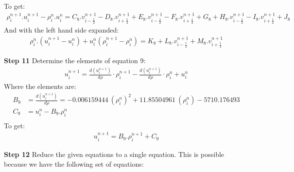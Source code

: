 \documentclass[11pt,letterpaper,titlepage]{article}
\newcommand{\half}{\frac{1}{2}}
\begin{document}
\newline
To get:
\begin{equation*}
\begin{aligned}
\rho_i^{n+1}.u_i^{n+1}-\rho_i^{n}.u_i^{n}=C_8.v_{i-\half}^{n+1}-D_8.v_{i+\half}^{n+1}+E_8.v_{i-\half}^{n+1}-F_8.v_{i+\half}^{n+1}+G_8+H_8.v_{i-\half}^{n+1}-I_8.v_{i+\half}^{n+1}+J_8
\end{aligned}
\end{equation*}
And with the left hand side expanded:
\begin{equation}
\begin{aligned}
\rho_i^{n}.(u_i^{n+1}-u_i^{n}) + u_i^{n}(\rho_i^{n+1}-\rho_i^{n})=K_8+L_8.v_{i-\half}^{n+1}+M_8.v_{i+\half}^{n+1}
\end{aligned}
\end{equation}








\newpage \noindent
\textbf{Step 11}\newline
Determine the elements of equation 9:
\begin{equation*}
\begin{aligned}
u_{i}^{n+1} = \frac{d(u_i^{n+1})}{d\rho}\cdot \rho_{i}^{n+1} -\frac{d(u_i^{n+1})}{d\rho}\cdot\rho_{i}^{n} +  u_{i}^{n}  
\end{aligned}
\end{equation*}
\newline
Where the elements are:
\begin{equation*}
\begin{aligned}
B_9&=\frac{d(u_i^{n+1})}{d\rho}=-0.006159444 \ (\rho_{i}^{n})^2+11.85504961 \ (\rho_{i}^{n}) -5710.176493\\
C_9&=u_i^n-B_9.\rho_i^n \\
\end{aligned}
\end{equation*}
\newline
To get:
\begin{equation}
\begin{aligned}
u_{i}^{n+1} = B_9.\rho_{i}^{n+1}+C_9
\end{aligned}
\end{equation}







\newpage \noindent
\textbf{Step 12}\newline
Reduce the given equations to a single equation. This is possible because we have the following set of equations:
\end{document}
